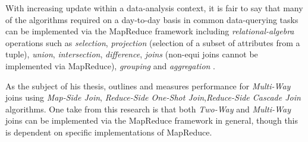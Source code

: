 With increasing update within a data-analysis context, it is fair to say that many of the algorithms required on a day-to-day basis in common data-querying tasks can be implemented via the MapReduce framework including \textit{relational-algebra} operations such as \textit{selection}, \textit{projection} (selection of a subset of attributes from a tuple), \textit{union}, \textit{intersection}, \textit{difference}, \textit{joins} (non-equi joins cannot be implemented via MapReduce), \textit{grouping} and \textit{aggregation} \cite{mining2011}.

As the subject of his thesis, \cite{chandar2010} outlines and measures performance for \textit{Multi-Way} joins using \textit{Map-Side Join}, \textit{Reduce-Side One-Shot Join},\textit{Reduce-Side Cascade Join} algorithms. One take from this research is that both \textit{Two-Way} and \textit{Multi-Way} joins can be implemented via the MapReduce framework in general, though this is dependent on specific implementations of MapReduce.